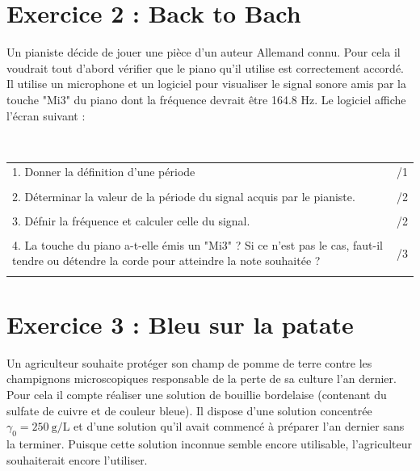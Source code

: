 \documentclass[a4paper,12pt]{article}
\begin{document}
\newpage
\section*{Exercice 2 : Back to Bach}
Un pianiste décide de jouer une pièce d'un auteur Allemand connu. Pour cela il voudrait tout d'abord vérifier que le piano qu'il utilise est correctement accordé. Il utilise un microphone et un logiciel pour visualiser le signal sonore amis par la touche "Mi3" du piano dont la fréquence devrait être 164.8 Hz.
Le logiciel affiche l'écran suivant :\\

\\

\begin{tabular}{m{.9\linewidth}|m{.1\linewidth}}
    1. Donner la définition d'une période & /1\\
    \rule{0pt}{2cm} & \\
    2. Déterminar la valeur de la période du signal acquis par le pianiste. & /2 \\
    \rule{0pt}{2cm} & \\
    3. Défnir la fréquence et calculer celle du signal. & /2\\
    \rule{0pt}{3cm} & \\
    4. La touche du piano a-t-elle émis un "Mi3" ? Si ce n'est pas le cas, faut-il tendre ou détendre la corde pour atteindre la note souhaitée ? & /3\\
    \rule{0pt}{4cm} & \\
\end{tabular}

\newpage
\section*{Exercice 3 : Bleu sur la patate}
Un agriculteur souhaite protéger son champ de pomme de terre contre les champignons microscopiques responsable de la perte de sa culture l'an dernier. Pour cela il compte réaliser une solution de bouillie bordelaise (contenant du sulfate de cuivre et de couleur bleue). Il dispose d'une solution concentrée $\gamma_0 = \SI{250}{\gram\per\liter}$ et d'une solution qu'il avait commencé à préparer l'an dernier sans la terminer. Puisque cette solution inconnue semble encore utilisable, l'agriculteur souhaiterait encore l'utiliser.
\end{document}
